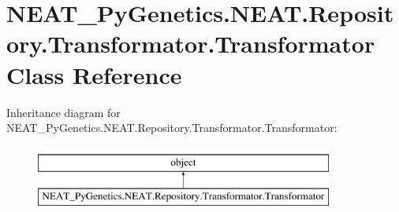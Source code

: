 \hypertarget{classNEAT__PyGenetics_1_1NEAT_1_1Repository_1_1Transformator_1_1Transformator}{}\section{N\+E\+A\+T\+\_\+\+Py\+Genetics.\+N\+E\+A\+T.\+Repository.\+Transformator.\+Transformator Class Reference}
\label{classNEAT__PyGenetics_1_1NEAT_1_1Repository_1_1Transformator_1_1Transformator}
Inheritance diagram for N\+E\+A\+T\+\_\+\+Py\+Genetics.\+N\+E\+A\+T.\+Repository.\+Transformator.\+Transformator\+:\begin{figure}[H]
\begin{center}
\leavevmode
\includegraphics[height=2.000000cm]{classNEAT__PyGenetics_1_1NEAT_1_1Repository_1_1Transformator_1_1Transformator}
\end{center}
\end{figure}
